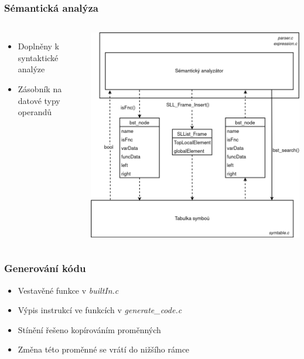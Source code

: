 \begin{frame}\frametitle{Sémantická analýza}
    \begin{columns}
        \begin{itemize}
        \setlength\itemsep{1em}
            \item Doplněny k syntaktické analýze
            \item Zásobník na datové typy operandů
        \end{itemize}
        
        \centering
        \includegraphics[scale=0.25,keepaspectratio]{img/DiagramSem.png}
    \end{columns}
\end{frame}



\begin{frame}
  \frametitle{Generování kódu}
  \begin{itemize}
        \setlength\itemsep{1em}
            \item Vestavěné funkce v \emph{builtIn.c}
            \item Výpis instrukcí ve funkcích v \emph{generate\_code.c}
            \item Stínění řešeno kopírováním proměnných
            \item Změna této proměnné se vrátí do nižšího rámce
        \end{itemize}
\end{frame}



